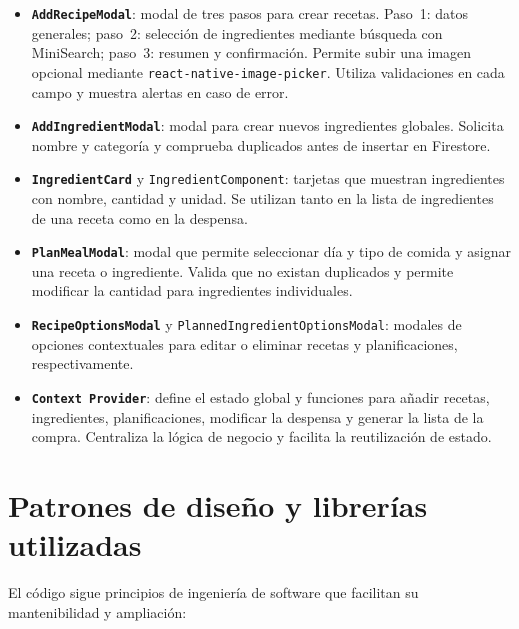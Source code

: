 \documentclass[twoside, openright, 11pt]{report}
\begin{document}
\begin{itemize}
  \item \textbf{\texttt{AddRecipeModal}}: modal de tres pasos para crear recetas. Paso 1: datos generales; paso 2: selección de ingredientes mediante búsqueda con MiniSearch; paso 3: resumen y confirmación. Permite subir una imagen opcional mediante \texttt{react-native-image-picker}. Utiliza validaciones en cada campo y muestra alertas en caso de error.
  \item \textbf{\texttt{AddIngredientModal}}: modal para crear nuevos ingredientes globales. Solicita nombre y categoría y comprueba duplicados antes de insertar en Firestore.
  \item \textbf{\texttt{IngredientCard}} y \texttt{IngredientComponent}: tarjetas que muestran ingredientes con nombre, cantidad y unidad. Se utilizan tanto en la lista de ingredientes de una receta como en la despensa.
  \item \textbf{\texttt{PlanMealModal}}: modal que permite seleccionar día y tipo de comida y asignar una receta o ingrediente. Valida que no existan duplicados y permite modificar la cantidad para ingredientes individuales.
  \item \textbf{\texttt{RecipeOptionsModal}} y \texttt{\texttt{PlannedIngredientOptionsModal}}: modales de opciones contextuales para editar o eliminar recetas y planificaciones, respectivamente.
  \item \textbf{\texttt{Context Provider}}: define el estado global y funciones para añadir recetas, ingredientes, planificaciones, modificar la despensa y generar la lista de la compra. Centraliza la lógica de negocio y facilita la reutilización de estado.
\end{itemize}

\section{Patrones de diseño y librerías utilizadas}
El código sigue principios de ingeniería de software que facilitan su mantenibilidad y ampliación:
\end{document}
